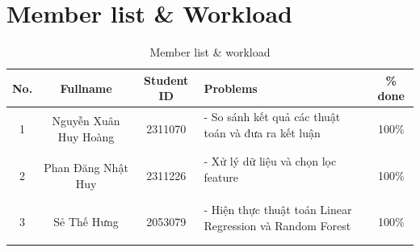 
\section*{Member list \& Workload}
\begin{center}
\begin{table}[h]
\centering
\begin{tabular}{|c|c|c|p{6cm}|c|}
\hline
\textbf{No.} & \textbf{Fullname} & \textbf{Student ID} & \textbf{Problems} & \textbf{\% done}\\
\hline 
\multirow{3}{*}{1} & \multirow{3}{*}{Nguyễn Xuân Huy Hoàng} & \multirow{3}{*}{2311070} & 
        - So sánh kết quả các thuật toán và đưa ra kết luận & \multirow{3}{*}{100\%}\\
 & &  & &\\
 & &  & &\\
\hline 
\multirow{4}{*}{2} & \multirow{4}{*}{Phan Đăng Nhật Huy} & \multirow{4}{*}{2311226} & 
        - Xử lý dữ liệu và chọn lọc feature & \multirow{4}{*}{100\%}\\
 & &  & &\\
 & &  & &\\
 & &  & &\\
\hline
\multirow{3}{*}{3} & \multirow{3}{*}{Sẻ Thế Hưng} & \multirow{3}{*}{2053079} & 
        - Hiện thực thuật toán Linear Regression và Random Forest  & \multirow{3}{*}{100\%}\\
 & &  & &\\
 & &  & &\\
\hline

\end{tabular}
\caption{\label{table1}Member list \& workload}
\end{table}
\end{center}
